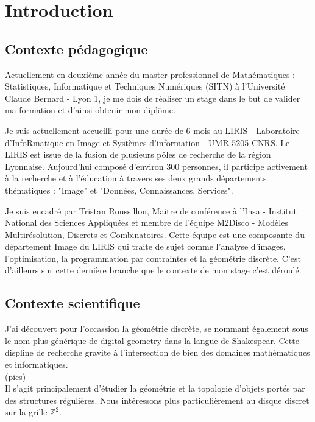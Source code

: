 \section{Introduction}

\subsection{Contexte pédagogique}

Actuellement en deuxième année du master professionnel de Mathématiques : Statistiques, Informatique et Techniques Numériques (SITN) à l’Université Claude Bernard - Lyon 1, je me dois de réaliser un stage dans le but de valider ma formation et d'ainsi obtenir mon diplôme. \newline

Je suis actuellement accueilli pour une durée de 6 mois au LIRIS - Laboratoire d'InfoRmatique en Image et Systèmes d'information - UMR 5205 CNRS. Le LIRIS est issue de la fusion de plusieurs pôles de recherche de la région Lyonnaise. Aujourd'hui composé d'environ 300 personnes, il participe activement à la recherche et à l'éducation à travers ses deux grands départements thématiques : "Image" et "Données, Connaissances, Services".\newline

Je suis encadré par Tristan Roussillon, Maitre de conférence à l'Insa - Institut National des Sciences Appliquées et membre de l'équipe M2Disco - Modèles Multirésolution, Discrets et Combinatoires. Cette équipe est une composante du département Image du LIRIS qui traite de sujet comme l'analyse d'images, l'optimisation, la programmation par contraintes et la géométrie discrète. C'est d'ailleurs sur cette dernière branche que le contexte de mon stage c'est déroulé.



\subsection{Contexte scientifique}

J'ai découvert pour l'occassion la géométrie discrète, se nommant également sous le nom plus générique de digital geometry dans la langue de Shakespear. Cette displine de recherche gravite à l'intersection de bien des domaines mathématiques et informatiques.\\

(pics)\\

Il s'agit principalement d'étudier la géométrie et la topologie d'objets portés par des structures régulières. Nous intéressons plus particulièrement au disque discret sur la grille $\mathbb{Z}^{2}$. 
